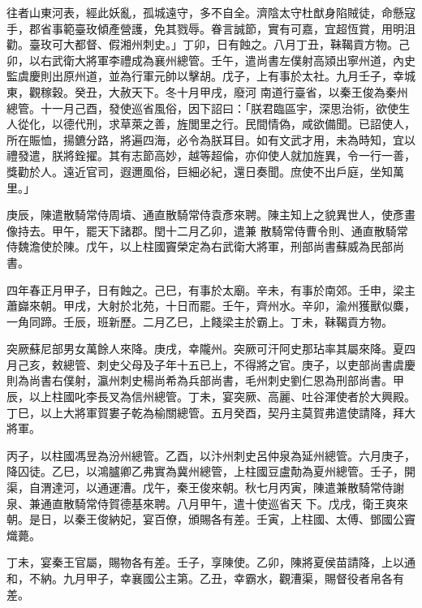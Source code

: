 \begin{pinyinscope}
 往者山東河表，經此妖亂，孤城遠守，多不自全。濟陰太守杜猷身陷賊徒，命懸寇手，郡省事範臺玫傾產營護，免其戮辱。眷言誠節，實有可嘉，宜超恆賞，用明沮勸。臺玫可大都督、假湘州刺史。」丁卯，日有蝕之。八月丁丑，靺鞨貢方物。己卯，以右武衛大將軍李禮成為襄州總管。壬午，遣尚書左僕射高熲出寧州道，內史監虞慶則出原州道，並為行軍元帥以擊胡。戊子，上有事於太社。九月壬子，幸城東，觀稼穀。癸丑，大赦天下。冬十月甲戌，廢河
 南道行臺省，以秦王俊為秦州總管。十一月己酉，發使巡省風俗，因下詔曰：「朕君臨區宇，深思治術，欲使生人從化，以德代刑，求草萊之善，旌閭里之行。民間情偽，咸欲備聞。已詔使人，所在賑恤，揚鑣分路，將遍四海，必令為朕耳目。如有文武才用，未為時知，宜以禮發遣，朕將銓擢。其有志節高妙，越等超倫，亦仰使人就加旌異，令一行一善，獎勸於人。遠近官司，遐邇風俗，巨細必紀，還日奏聞。庶使不出戶庭，坐知萬里。」



 庚辰，陳遣散騎常侍周墳、通直散騎常侍袁彥來聘。陳主知上之貌異世人，使彥畫像持去。甲午，罷天下諸郡。閏十二月乙卯，遣兼
 散騎常侍曹令則、通直散騎常侍魏澹使於陳。戊午，以上柱國竇榮定為右武衛大將軍，刑部尚書蘇威為民部尚書。



 四年春正月甲子，日有蝕之。己巳，有事於太廟。辛未，有事於南郊。壬申，梁主蕭巋來朝。甲戌，大射於北苑，十日而罷。壬午，齊州水。辛卯，渝州獲獸似麋，一角同蹄。壬辰，班新歷。二月乙巳，上餞梁主於霸上。丁未，靺鞨貢方物。



 突厥蘇尼部男女萬餘人來降。庚戌，幸隴州。突厥可汗阿史那玷率其屬來降。夏四月己亥，敕總管、刺史父母及子年十五已上，不得將之官。庚子，以吏部尚書虞慶
 則為尚書右僕射，瀛州刺史楊尚希為兵部尚書，毛州刺史劉仁恩為刑部尚書。甲辰，以上柱國叱李長叉為信州總管。丁未，宴突厥、高麗、吐谷渾使者於大興殿。丁巳，以上大將軍賀婁子乾為榆關總管。五月癸酉，契丹主莫賀弗遣使請降，拜大將軍。



 丙子，以柱國馮昱為汾州總管。乙酉，以汴州刺史呂仲泉為延州總管。六月庚子，降囚徒。乙巳，以鴻臚卿乙弗實為冀州總管，上柱國豆盧勣為夏州總管。壬子，開渠，自渭達河，以通運漕。戊午，秦王俊來朝。秋七月丙寅，陳遣兼散騎常侍謝泉、兼通直散騎常侍賀德基來聘。八月甲午，遣十使巡省天
 下。戊戌，衛王爽來朝。是日，以秦王俊納妃，宴百僚，頒賜各有差。壬寅，上柱國、太傅、鄧國公竇熾薨。



 丁未，宴秦王官屬，賜物各有差。壬子，享陳使。乙卯，陳將夏侯苗請降，上以通和，不納。九月甲子，幸襄國公主第。乙丑，幸霸水，觀漕渠，賜督役者帛各有差。




\end{pinyinscope}
